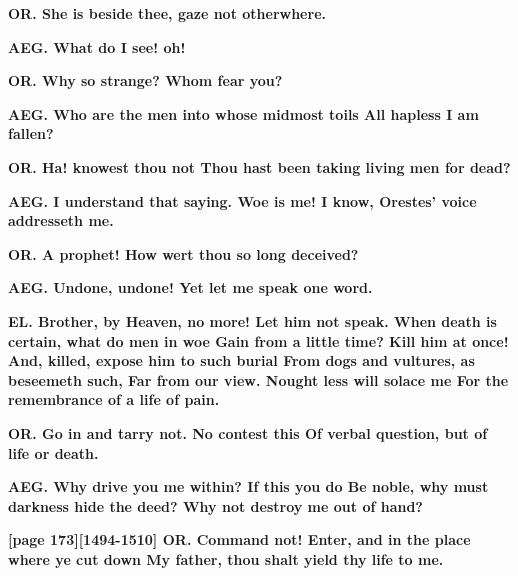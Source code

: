 \documentclass[11pt,letter]{book}
\begin{document}
\par \textbf{OR. She is beside thee, gaze not otherwhere.}
\par 

\par \textbf{AEG. What do I see! oh!}
\par 

\par \textbf{OR. Why so strange? Whom fear you?}
\par 

\par \textbf{AEG. Who are the men into whose midmost toils All hapless I am fallen?}
\par 

\par \textbf{OR. Ha! knowest thou not Thou hast been taking living men for dead?}
\par 

\par \textbf{AEG. I understand that saying. Woe is me! I know, Orestes’ voice addresseth me.}
\par 

\par \textbf{OR. A prophet! How wert thou so long deceived?}
\par 

\par \textbf{AEG. Undone, undone! Yet let me speak one word.}
\par 

\par \textbf{EL. Brother, by Heaven, no more! Let him not speak. When death is certain, what do men in woe Gain from a little time? Kill him at once! And, killed, expose him to such burial From dogs and vultures, as beseemeth such, Far from our view. Nought less will solace me For the remembrance of a life of pain.}
\par 

\par \textbf{OR. Go in and tarry not. No contest this Of verbal question, but of life or death.}
\par 

\par \textbf{AEG. Why drive you me within? If this you do Be noble, why must darkness hide the deed? Why not destroy me out of hand?}
\par 

\par \textbf{[page 173][1494-1510] OR. Command not! Enter, and in the place where ye cut down My father, thou shalt yield thy life to me.}
\par 
\end{document}
